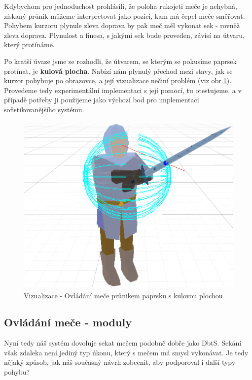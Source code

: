 Kdybychom pro jednoduchost prohlásili, že poloha rukojeti meče je nehybná, získaný průnik můžeme interpretovat jako pozici, kam má čepel meče směřovat. Pohybem kurzoru plynule zleva doprava by pak meč měl vykonat sek - rovněž zleva doprava. Plynulost a finesa, s jakými sek bude proveden, závisí na útvaru, který protínáme. 

Po kratší úvaze jsme se rozhodli, že útvarem, se kterým se pokusíme paprsek protínat, je \textbf{kulová plocha}. Nabízí nám plynulý přechod mezi stavy, jak se kurzor pohybuje po obrazovce, a její vizualizace nečiní problém (viz obr.\ref{obr04:sphereVisualization}).
\bigbreak
Provedeme tedy experimentální implementaci s její pomocí, tu otestujeme, a v případě potřeby ji použijeme jako výchozí bod pro implementaci sofistikovanějšího systému.

\begin{figure}[ht]\centering
    \center
    \includegraphics[height=90mm]{../img/IntersectableSphere.png}
    \caption{Vizualizace - Ovládání meče průnikem paprsku s kulovou plochou}
    \label{obr04:sphereVisualization}
\end{figure} 

\pagebreak

\subsection{Ovládání meče - moduly} \label{interfacesSwordMovementModulesSubsection}

Nyní tedy náš systém dovoluje sekat mečem podobně dobře jako \acl{DbtS}. Sekání však zdaleka není jediný typ úkonu, který s mečem má smysl vykonávat. Je tedy nějaký způsob, jak náš současný návrh zobecnit, aby podporoval i další typy pohybu?

